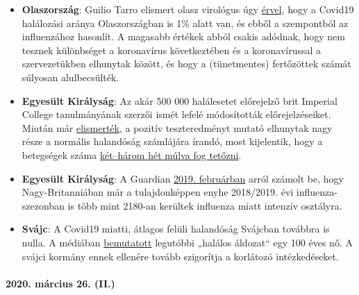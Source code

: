\begin{itemize}
\tightlist
\item
  \textbf{Olaszország}: Guilio Tarro elismert olasz virológus úgy
  \href{https://www.cybermednews.eu/index.php/it/health/70871-interview-to-the-virologist-giulio-tarro-the-death-rate-of-covid-19-is-less-than-1-as-confirmed-by-the-national-institute-of-allergy-and-infectious-diseases}{érvel},
  hogy a Covid19 halálozási aránya Olaszországban is 1\% alatt van, és
  ebből a szempontból az influenzához hasonlít. A magasabb értékek abból
  csakis adódnak, hogy nem tesznek különbséget a koronavírus
  következtében és a koronavírussal a szervezetükben elhunytak között,
  és hogy a (tünetmentes) fertőzöttek számát súlyosan alulbecsülték.
\item
  \textbf{Egyesült Királyság}: Az akár 500 000 halálesetet előrejelző
  brit Imperial College tanulmányának szerzői ismét lefelé módosították
  előrejelzéseiket. Miután már
  \href{https://www.bbc.com/news/health-51979654}{elismerték}, a pozitív
  teszteredményt mutató elhunytak nagy része a normális halandóság
  számlájára írandó, most kijelentik, hogy a betegségek száma
  \href{https://www.thetimes.co.uk/article/nhs-now-likely-to-cope-with-coronavirus-says-key-scientist-rn5m6nggk}{két--három
  hét múlva fog tetőzni}.
\item
  \textbf{Egyesült Királyság}: A Guardian
  \href{https://www.theguardian.com/society/2019/feb/20/britons-urged-to-get-flu-vaccine-as-critical-cases-rise-above-2000}{2019.
  februárban} arról számolt be, hogy Nagy-Britanniában már a
  tulajdonképpen enyhe 2018/2019. évi influenza-szezonban is több mint
  2180-an kerültek influenza miatt intenzív osztályra.
\item
  \textbf{Svájc}: A Covid19 miatti, átlagos felüli halandóság Svájcban
  továbbra is nulla. A médiában
  \href{https://www.nau.ch/ort/basel/drei-weitere-covid-19-todesfalle-in-basel-stadt-65684099}{bemutatott}
  legutóbbi „halálos áldozat`` egy 100 éves nő. A svájci kormány ennek
  ellenére tovább szigorítja a korlátozó intézkedéseket.
\end{itemize}

\hypertarget{2020-muxe1rcius-26-ii}{%
\paragraph{2020. március 26. (II.)}\label{2020-muxe1rcius-26-ii}}

